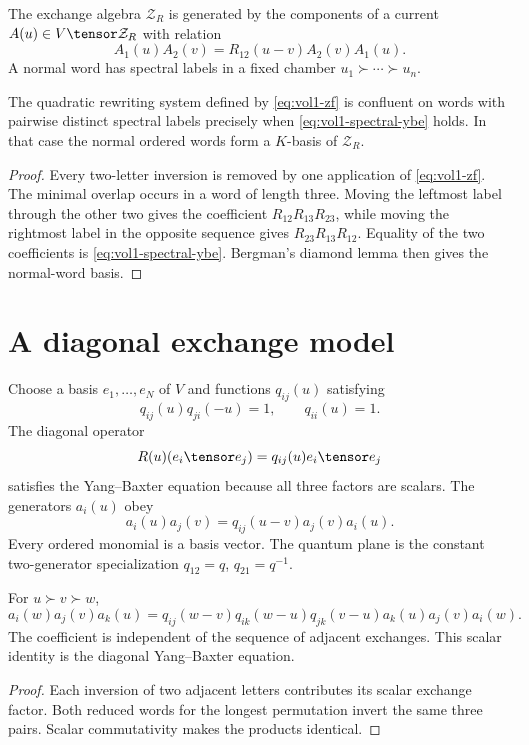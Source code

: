 \begin{definition}
The exchange algebra $\mathcal Z_R$ is generated by the components of a current $A(u)\in V\tensor\mathcal Z_R$ with relation
\begin{equation}\label{eq:vol1-zf}
 A_1(u)A_2(v)=R_{12}(u-v)A_2(v)A_1(u).
\end{equation}
A normal word has spectral labels in a fixed chamber $u_1\succ\cdots\succ u_n$.
\end{definition}

\begin{theorem}
The quadratic rewriting system defined by \eqref{eq:vol1-zf} is confluent on words with pairwise distinct spectral labels precisely when \eqref{eq:vol1-spectral-ybe} holds.  In that case the normal ordered words form a $K$-basis of $\mathcal Z_R$.
\end{theorem}
\begin{proof}
Every two-letter inversion is removed by one application of \eqref{eq:vol1-zf}.  The minimal overlap occurs in a word of length three.  Moving the leftmost label through the other two gives the coefficient
$R_{12}R_{13}R_{23}$, while moving the rightmost label in the opposite sequence gives $R_{23}R_{13}R_{12}$.  Equality of the two coefficients is \eqref{eq:vol1-spectral-ybe}.  Bergman's diamond lemma then gives the normal-word basis.
\end{proof}

\section{A diagonal exchange model}
Choose a basis $e_1,\ldots,e_N$ of $V$ and functions $q_{ij}(u)$ satisfying
\[
 q_{ij}(u)q_{ji}(-u)=1,
 \qquad q_{ii}(u)=1.
\]
The diagonal operator
\[
 R(u)(e_i\tensor e_j)=q_{ij}(u)e_i\tensor e_j
\]
satisfies the Yang--Baxter equation because all three factors are scalars.  The generators $a_i(u)$ obey
\[
 a_i(u)a_j(v)=q_{ij}(u-v)a_j(v)a_i(u).
\]
Every ordered monomial is a basis vector.  The quantum plane is the constant two-generator specialization $q_{12}=q$, $q_{21}=q^{-1}$.

\begin{calculation}
For $u\succ v\succ w$,
\[
 a_i(w)a_j(v)a_k(u)
 =q_{ij}(w-v)q_{ik}(w-u)q_{jk}(v-u)
  a_k(u)a_j(v)a_i(w).
\]
The coefficient is independent of the sequence of adjacent exchanges.  This scalar identity is the diagonal Yang--Baxter equation.
\end{calculation}
\begin{proof}
Each inversion of two adjacent letters contributes its scalar exchange factor.  Both reduced words for the longest permutation invert the same three pairs.  Scalar commutativity makes the products identical.
\end{proof}

